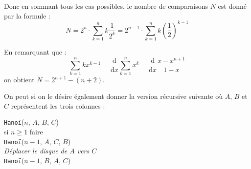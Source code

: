 Donc en sommant tous les cas possibles, le nombre de comparaisons $N$ est donné par la formule :
\[
    N = 2^n\cdot\sum_{k=1}^nk\frac{1}{2^k}=2^{n-1}\cdot\sum_{k=1}^nk\left(\frac{1}{2}\right)^{k-1}
\]

En remarquant que :
\[
    \sum_{k=1}^nkx^{k-1} = \frac{\textrm{d}}{\textrm{d}x}\sum_{k=1}^nx^k = \frac{\textrm{d}}{\textrm{d}x}\frac{x-x^{n+1}}{1-x}
\]
on obtient $N = 2^{n+1}-(n+2)$.
\medskip

On peut si on le désire également donner la version récursive suivante où $A$, $B$ et $C$ représentent les trois colonnes :
\medskip

\texttt{Hanoï}($n$, $A$, $B$, $C$)\\
\hspace*{2em} si $n \geq 1$ faire\\
\hspace*{4em}   \texttt{Hanoï}($n-1$, $A$, $C$, $B$)\\
\hspace*{4em}   \textit{Déplacer le disque de $A$ vers $C$}\\
\hspace*{4em}   \texttt{Hanoï}($n-1$, $B$, $A$, $C$)
\bigskip

\Fin
